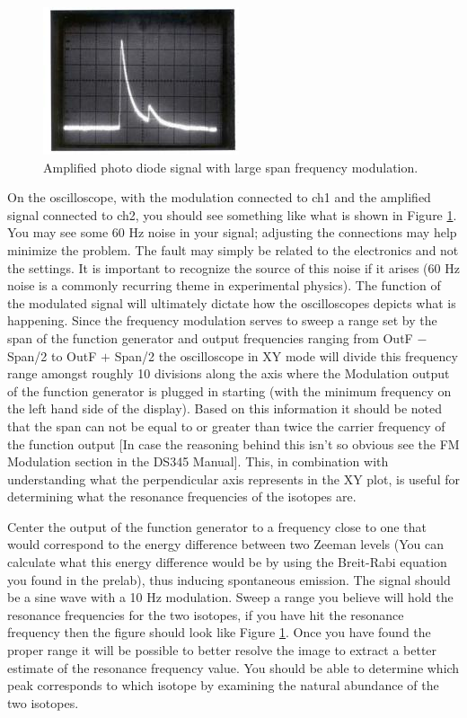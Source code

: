 \documentclass{../lab}
\begin{document}
\begin{figure}[ht]
    \centering
    \includegraphics[width=0.6\linewidth]{images/PhotodiodeSignal}
    \caption{Amplified photo diode signal with large span frequency modulation.}
    \label{fig:PhotodiodeSignal}
\end{figure}

\newpage

On the oscilloscope, with the modulation connected to ch1 and the amplified signal connected to ch2, you should see something like what is shown in Figure \ref{fig:PhotodiodeSignal}. You may see some 60 Hz noise in your signal; adjusting the connections may help minimize the problem. The fault may simply be related to the electronics and not the settings. It is important to recognize the source of this noise if it arises (60 Hz noise is a commonly recurring theme in experimental physics). The function of the modulated signal will ultimately dictate how the oscilloscopes depicts what is happening. Since the frequency modulation serves to sweep a range set by the span of the function generator and output frequencies ranging from OutF $−$ Span/2 to OutF $+$ Span/2 the oscilloscope in XY mode will divide this frequency range amongst roughly 10 divisions along the axis where the Modulation output of the function generator is plugged in starting (with the minimum frequency on the left hand side of the display). Based on this information it should be noted that the span can not be equal to or greater than twice the carrier frequency of the function output [In case the reasoning behind this isn't so obvious see the  FM Modulation section in the DS345 Manual]. This, in combination with understanding what the perpendicular axis represents in the XY plot, is useful for determining what the resonance frequencies of the isotopes are. 

Center the output of the function generator to a frequency close to one that would correspond to the energy difference between two Zeeman levels (You can calculate what this energy difference would be by using the Breit-Rabi equation you found in the prelab), thus inducing spontaneous emission. The signal should be a sine wave with a 10 Hz modulation. Sweep a range you believe will hold the resonance frequencies for the two isotopes, if you have hit the resonance frequency then the figure should look like Figure \ref{fig:PhotodiodeSignal}. Once you have found the proper range it will be possible to better resolve the image to extract a better estimate of the resonance frequency value. You should be able to determine which peak corresponds to which isotope by examining the natural abundance of the two isotopes.
\end{document}
